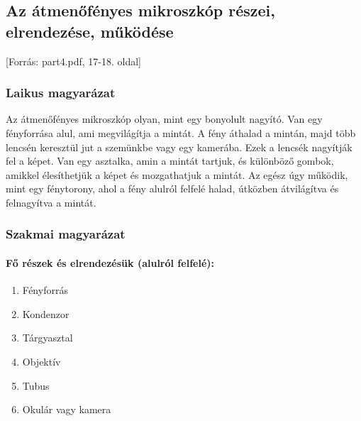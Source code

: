 \documentclass[a4paper,12pt]{article}
\begin{document}
\subsection{Az átmenőfényes mikroszkóp részei, elrendezése, működése} [Forrás: part4.pdf, 17-18. oldal]

\subsubsection{Laikus magyarázat} Az átmenőfényes mikroszkóp olyan, mint egy bonyolult nagyító. Van egy fényforrása alul, ami megvilágítja a mintát. A fény áthalad a mintán, majd több lencsén keresztül jut a szemünkbe vagy egy kamerába. Ezek a lencsék nagyítják fel a képet. Van egy asztalka, amin a mintát tartjuk, és különböző gombok, amikkel élesíthetjük a képet és mozgathatjuk a mintát. Az egész úgy működik, mint egy fénytorony, ahol a fény alulról felfelé halad, útközben átvilágítva és felnagyítva a mintát.

\subsubsection{Szakmai magyarázat}

\paragraph{Fő részek és elrendezésük (alulról felfelé):} \begin{enumerate} \item Fényforrás \item Kondenzor \item Tárgyasztal \item Objektív \item Tubus \item Okulár vagy kamera \end{enumerate}
\end{document}
